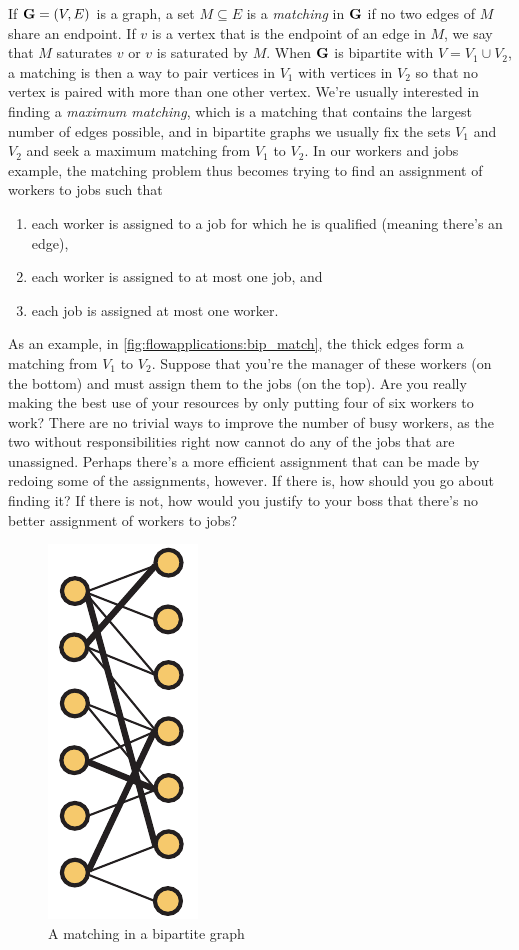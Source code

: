 If $\mathbf{G}=(V,E)$ is a graph, a set $M\subseteq E$ is a \emph{matching} in
$\mathbf{G}$ if no two edges of $M$ share an endpoint. If $v$ is a vertex
that is the endpoint of an edge in $M$, we say that $M$ saturates $v$
or $v$ is saturated by $M$. When $\mathbf{G}$ is bipartite with $V=V_1\cup
V_2$, a matching is then a way to pair vertices in $V_1$ with vertices
in $V_2$ so that no vertex is paired with more than one other
vertex. We're usually interested in finding a \emph{maximum matching},
which is a matching that contains the largest number of edges
possible, and in bipartite graphs we usually fix the sets $V_1$ and
$V_2$ and seek a maximum matching from $V_1$ to $V_2$. In our workers
and jobs example, the matching problem thus becomes trying to find an
assignment of workers to jobs such that
\begin{enumerate}[label=(\roman*)]
\item each worker is assigned to a job for which he is qualified
  (meaning there's an edge),
\item each worker is assigned to at most one job, and
\item each job is assigned at most one worker.
\end{enumerate}

As an example, in \autoref{fig:flowapplications:bip_match}, the thick
edges form a matching from $V_1$ to $V_2$. Suppose that you're the
manager of these workers (on the bottom) and must assign them to the
jobs (on the top). Are you really making the best use of your
resources by only putting four of six workers to work? There are no
trivial ways to improve the number of busy workers, as the two without
responsibilities right now cannot do any of the jobs that are
unassigned. Perhaps there's a more efficient assignment that can be
made by redoing some of the assignments, however. If there is, how
should you go about finding it? If there is not, how would you justify
to your boss that there's no better assignment of workers to jobs?
\begin{figure}[h]
  \centering
  \includegraphics[scale=0.65,angle=90]{flowapplications-figs/bipartite_graph_part_match}
  \caption{A matching in a bipartite graph}
  \label{fig:flowapplications:bip_match}
\end{figure}


